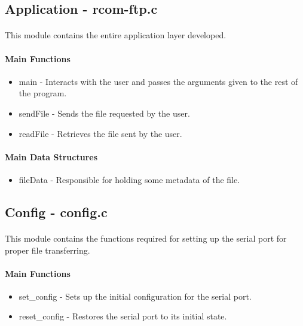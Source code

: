 \documentclass[11pt]{article}
\begin{document}
\subsection{Application - rcom-ftp.c}

\paragraph{}This module contains the entire application layer developed.

\paragraph{Main Functions}

\begin{itemize}
        \item{main - Interacts with the user and passes the arguments given to the rest of the program.}
        \item{sendFile - Sends the file requested by the user.}
        \item{readFile - Retrieves the file sent by the user.}
\end{itemize}

\paragraph{Main Data Structures}

\begin{itemize}
        \item{fileData - Responsible for holding some metadata of the file.}
\end{itemize}

\subsection{Config - config.c}

\paragraph{}This module contains the functions required for setting up the serial port for proper file transferring.

\paragraph{Main Functions}

\begin{itemize}
        \item{set\_config - Sets up the initial configuration for the serial port.}
        \item{reset\_config - Restores the serial port to its initial state.}
\end{itemize}
\end{document}
